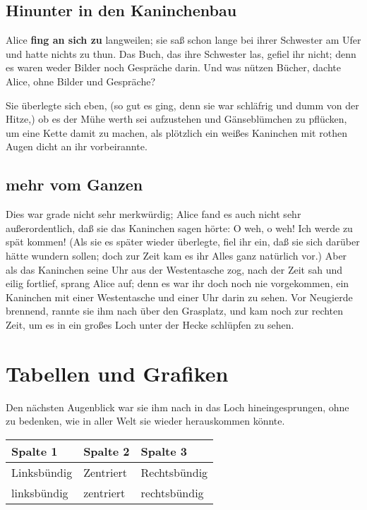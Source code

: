 \documentclass[DIV=calc,10pt,parskip=half,twocolumn]{scrartcl}
\begin{document}


\subsection{Hinunter in den Kaninchenbau}

Alice {\bfseries fing an sich zu} langweilen; sie saß schon lange bei ihrer Schwester am
Ufer und hatte nichts zu thun. Das Buch, das ihre Schwester las, gefiel ihr
nicht; denn es waren weder Bilder noch Gespräche darin. \grqq{} Und was nützen
Bücher,\grqq{}  dachte Alice, \grqq{}ohne Bilder und Gespräche?\grqq 

Sie überlegte sich eben, (so gut es ging, denn sie war schläfrig und dumm von
der Hitze,) ob es der Mühe werth sei aufzustehen und Gänseblümchen zu pflücken,
um eine Kette damit zu machen, als plötzlich ein weißes Kaninchen mit rothen
Augen dicht an ihr vorbeirannte.

\subsection{mehr vom Ganzen}

Dies war grade nicht sehr merkwürdig; Alice fand es auch nicht sehr
außerordentlich, daß sie das Kaninchen sagen hörte: \grqq{} O weh, o weh! Ich werde zu
spät kommen!\grqq{}  (Als sie es später wieder überlegte, fiel ihr ein, daß sie sich
darüber hätte wundern sollen; doch zur Zeit kam es ihr Alles ganz natürlich
vor.) Aber als das Kaninchen seine Uhr aus der Westentasche zog, nach der Zeit
sah und eilig fortlief, sprang Alice auf; denn es war ihr doch noch nie
vorgekommen, ein Kaninchen mit einer Westentasche und einer Uhr darin zu sehen.
Vor Neugierde brennend, rannte sie ihm nach über den Grasplatz, und kam noch
zur rechten Zeit, um es in ein großes Loch unter der Hecke schlüpfen zu sehen.




\section{Tabellen und Grafiken}

Den nächsten Augenblick war sie ihm nach in das Loch hineingesprungen, ohne zu
bedenken, wie in aller Welt sie wieder herauskommen könnte.

\begin{center}
\begin{tabular}{lll}
  \toprule
   Spalte 1 &  Spalte 2 & Spalte 3\\
   \midrule
   Linksbündig & Zentriert & Rechtsbündig\\
   linksbündig & zentriert & rechtsbündig\\
   \bottomrule
\end{tabular}
\end{center}
\end{document}

